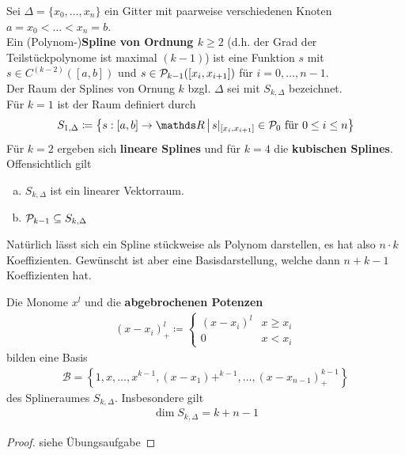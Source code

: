 \begin{Defe}
  Sei $\Delta =\{x_0,\dots,x_n\} $ ein Gitter
  mit paarweise verschiedenen Knoten $a=x_0<\dots<x_n=b$.\\
  Ein (Polynom-)\textbf{Spline von Ordnung $k$}$\geq 2$ 
  (d.h. der Grad der Teilstückpolynome ist maximal $(k-1)$)
  ist eine Funktion $s$ mit $s\in C^{(k-2)}([a,b])$
  und $s\in\mathcal{P}_{k-1}([x_i,x_{i+1}])$
  für $i=0,\dots,n-1$.\\
  Der Raum der Splines von Ornung $k$ bzgl. $\Delta$ sei
  mit $S_{k,\Delta}$ bezeichnet.\\
  Für $k=1$ ist der Raum definiert durch
  \begin{gather*}
    S_{1,\Delta} \coloneqq 
    \left\{
      s:[a,b]\rightarrow\R\,\middle\vert\,
      s|_{[x_i,x_{i+1}]}\in\p_0
      \text{ für } 0\leq i\leq n
    \right\}
  \end{gather*}
  Für $k=2$ ergeben sich \textbf{lineare Splines}
  und für $k=4$ die \textbf{kubischen Splines}.\\
  Offensichtlich gilt
  \begin{enumerate}[a)]
  \item $S_{k,\Delta}$ ist ein linearer Vektorraum.
  \item $\mathcal{P}_{k-1}\subseteq S_{k,\Delta}$
  \end{enumerate}
  Natürlich lässt sich ein Spline stückweise als Polynom darstellen,
  es hat also $n\cdot k$ Koeffizienten.
  Gewünscht ist aber eine Basisdarstellung,
  welche dann $n+k-1$ Koeffizienten hat.
\end{Defe}

\begin{Satze}\label{6.2.2}
  Die Monome $x^l$ und die \textbf{abgebrochenen Potenzen}
  \begin{gather}
    (x-x_i)_+^l\coloneqq
    \begin{cases}
      (x-x_i)^l & x\geq x_i\\
      0         & x<x_i
    \end{cases}
    \label{VI.2.1}
  \end{gather}
  bilden eine Basis
  \begin{gather*}
    \mathcal{B}=
    \left\{
      1,x,\dots,x^{k-1},(x-x_1)+^{k-1},\dots,(x-x_{n-1})_+^{k-1}
    \right\}
  \end{gather*}
  des Splineraumes $S_{k,\Delta}$. Insbesondere gilt
  \begin{gather}
    \dim S_{k,\Delta}=k+n-1
    \label{VI.2.2}
  \end{gather}
  \label{im6.2.2}

  \begin{proof}
    siehe Übungsaufgabe
  \end{proof}
\end{Satze}


